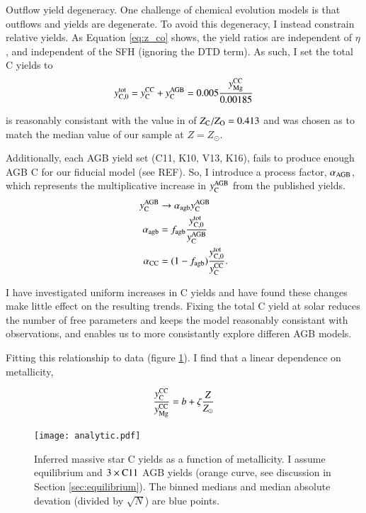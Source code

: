 \documentclass[12pt,oneside]{report}
\newcommand{\Ycc}{\ensuremath{y_{\rm C}^{\rm CC}}}
\newcommand{\Yct}{\ensuremath{y_{\rm C, 0}^{\rm tot}}}
\newcommand{\Yoc}{\ensuremath{y_{\rm Mg}^{\rm CC}}}
\newcommand{\Ycagb}{\ensuremath{y_{\rm C}^{\rm AGB}}}
\newcommand{\sun}{\ensuremath{\odot}}
\begin{document}
Outflow yield degeneracy.
One challenge of chemical evolution models is that outflows and yields are degenerate. To avoid this degeneracy, I instead constrain relative yields. As Equation \ref{eq:z_co} shows, the yield ratios are independent of $\eta$, and independent of the SFH (ignoring the DTD term).
As such, I set the total C yields to 
\begin{equation}
    \Yct = \Ycc + \Ycagb = 0.005 \frac{\Yoc}{0.00185}
\end{equation}

is reasonably consistant with the value in \citet{asplund+09} of $Z_{\rm
C}/Z_{\rm O}=0.413$ and was chosen as to match the median value of our sample
at $Z=Z_{\sun }$. 

Additionally, each AGB yield set (C11, K10, V13, K16), fails to produce enough AGB C for our fiducial model (see REF). So, I introduce a process factor, $\alpha_{\rm AGB}$, which represents the multiplicative increase in $\Ycagb$ from the published yields.
\begin{subequations}
    \begin{align}
        \Ycagb &\rightarrow \alpha_{\rm agb}  \Ycagb \\
        \alpha_{\rm agb} &= f_{\rm agb} \frac{\Yct}{\Ycagb} \\
        \alpha_{\rm CC} &= (1 - f_{\rm agb}) \frac{\Yct}{\Ycc}.
    \end{align}
\end{subequations}

I have investigated uniform increases in C yields and have found these changes make little effect on the resulting trends. Fixing the total C yield at solar reduces the number of free parameters and keeps the model reasonably consistant with observations, and enables us to more consistantly explore differen AGB models. 

Fitting this relationship to data (figure \ref{fig:analytic}).
I find that a linear dependence on metallicity,


\begin{equation}
    \frac{\Ycc}{\Yoc} = b + \zeta \frac{Z}{Z_\odot}
\end{equation}

\begin{figure}
    \centering
    \texttt{[image: analytic.pdf]}
    \caption[Reverse fit yields]{Inferred massive star C yields as a function of metallicity. I assume equilibrium and $3\times {\rm C11}$ AGB yields (orange curve, see discussion in Section \ref{sec:equilibrium}). The binned medians and median absolute devation (divided by $\sqrt{N}$) are blue points.
    }
    \label{fig:analytic}
\end{figure}
\end{document}
